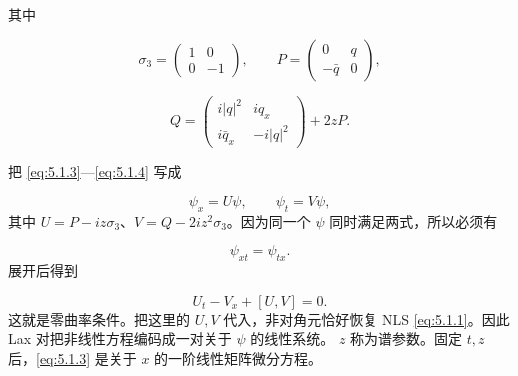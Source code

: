 \documentclass[
    lang=cn,
    scheme=chinese,
    mode=simple,
    device=normal,
    color=blue,
    math=cm,
    thmcnt=section,
    12pt,
    nowatermark
]{elegantbook}
\begin{document}
其中

\[
    \sigma_3=
    \begin{pmatrix}
        1 & 0  \\
        0 & -1
    \end{pmatrix},
    \qquad
    P=
    \begin{pmatrix}
        0       & q \\
        -\bar q & 0
    \end{pmatrix},
\]

\[
    Q=
    \begin{pmatrix}
        i\lvert q\rvert^2 & iq_x               \\
        i\bar q_x         & -i\lvert q\rvert^2
    \end{pmatrix}
    +2zP.
\]

\begin{callout}
    把 \eqref{eq:5.1.3}---\eqref{eq:5.1.4} 写成

    \[
        \psi_x=U\psi,\qquad \psi_t=V\psi,
    \]
    其中 $U=P-iz\sigma_3$、$V=Q-2iz^2\sigma_3$。因为同一个 $\psi$ 同时满足两式，所以必须有

    \[
        \psi_{xt}=\psi_{tx}.
    \]
    展开后得到

    \[
        U_t-V_x+[U,V]=0.
    \]
    这就是零曲率条件。把这里的 $U,V$ 代入，非对角元恰好恢复 NLS \eqref{eq:5.1.1}。因此 Lax 对把非线性方程编码成一对关于 $\psi$ 的线性系统。
    $z$ 称为谱参数。固定 $t,z$ 后，\eqref{eq:5.1.3} 是关于 $x$ 的一阶线性矩阵微分方程。
\end{callout}




\end{document}
